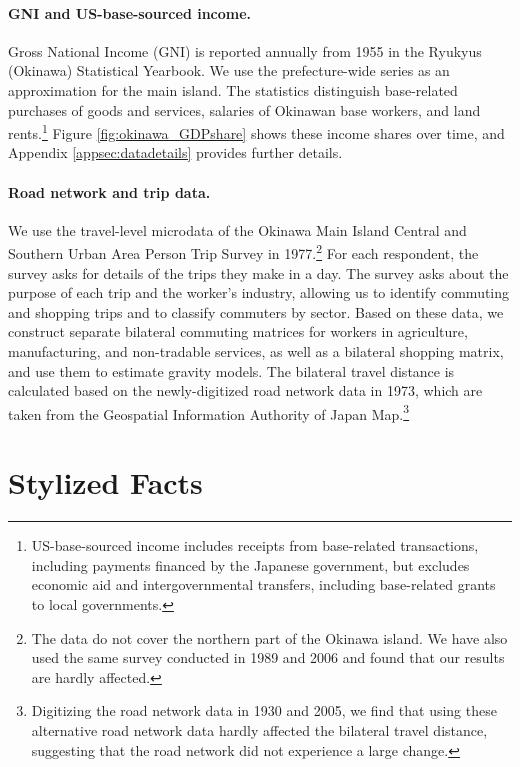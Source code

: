 \documentclass[12pt, unicode, a4paper]{article}
\newcommand{\1}{\mbox{1}\hspace{-0.25em}\mbox{l}} %
\begin{document}
\paragraph{GNI and US-base-sourced income.}
Gross National Income (GNI) is reported annually from 1955 in the Ryukyus (Okinawa) Statistical Yearbook. We use the prefecture-wide series as an approximation for the main island. The statistics distinguish base-related purchases of goods and services, salaries of Okinawan base workers, and land rents.\footnote{US-base-sourced income includes receipts from base-related transactions, including payments financed by the Japanese government, but excludes economic aid and intergovernmental transfers, including base-related grants to local governments.} Figure \ref{fig:okinawa_GDPshare} shows these income shares over time, and Appendix \ref{appsec:datadetails} provides further details.

\paragraph{Road network and trip data.} We use the travel-level microdata of the Okinawa Main Island Central and Southern Urban Area Person Trip Survey in 1977.\footnote{The data do not cover the northern part of the Okinawa island. 
We have also used the same survey conducted in 1989 and 2006 and found that our results are hardly affected.}  For each respondent, the survey asks for details of the trips they make in a day. 
The survey asks about the purpose of each trip and the worker's industry, allowing us to identify commuting and shopping trips and to classify commuters by sector. 
Based on these data, we construct separate bilateral commuting matrices for workers in agriculture, manufacturing, and non-tradable services, as well as a bilateral shopping matrix, and use them to estimate gravity models. The bilateral travel distance is calculated based on the newly-digitized road network data in 1973, which are taken from the Geospatial Information Authority of Japan Map.\footnote{
Digitizing the road network data in 1930 and 2005, we find that using these alternative road network data hardly affected the bilateral travel distance, suggesting that the road network did not experience a large change.
}







\section{Stylized Facts}\label{sec:reducedform}
\end{document}
